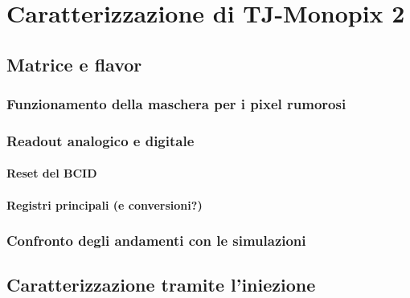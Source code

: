 
\chapter{Caratterizzazione di TJ-Monopix 2}

\section{Matrice e flavor}

\subsection{Funzionamento della maschera per i pixel rumorosi}

\subsection{Readout analogico e digitale}

\subsubsection{Reset del BCID}
\begin{comment}
REFERENZE
\end{comment}

\subsubsection{Registri principali (e conversioni?)}

\subsection{Confronto degli andamenti con le simulazioni}


\section{Caratterizzazione tramite l'iniezione}

